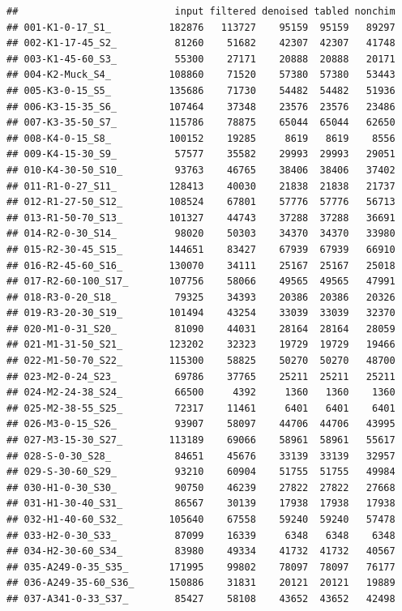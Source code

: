 \documentclass[]{article}
\begin{document}
\begin{verbatim}
##                           input filtered denoised tabled nonchim
## 001-K1-0-17_S1_          182876   113727    95159  95159   89297
## 002-K1-17-45_S2_          81260    51682    42307  42307   41748
## 003-K1-45-60_S3_          55300    27171    20888  20888   20171
## 004-K2-Muck_S4_          108860    71520    57380  57380   53443
## 005-K3-0-15_S5_          135686    71730    54482  54482   51936
## 006-K3-15-35_S6_         107464    37348    23576  23576   23486
## 007-K3-35-50_S7_         115786    78875    65044  65044   62650
## 008-K4-0-15_S8_          100152    19285     8619   8619    8556
## 009-K4-15-30_S9_          57577    35582    29993  29993   29051
## 010-K4-30-50_S10_         93763    46765    38406  38406   37402
## 011-R1-0-27_S11_         128413    40030    21838  21838   21737
## 012-R1-27-50_S12_        108524    67801    57776  57776   56713
## 013-R1-50-70_S13_        101327    44743    37288  37288   36691
## 014-R2-0-30_S14_          98020    50303    34370  34370   33980
## 015-R2-30-45_S15_        144651    83427    67939  67939   66910
## 016-R2-45-60_S16_        130070    34111    25167  25167   25018
## 017-R2-60-100_S17_       107756    58066    49565  49565   47991
## 018-R3-0-20_S18_          79325    34393    20386  20386   20326
## 019-R3-20-30_S19_        101494    43254    33039  33039   32370
## 020-M1-0-31_S20_          81090    44031    28164  28164   28059
## 021-M1-31-50_S21_        123202    32323    19729  19729   19466
## 022-M1-50-70_S22_        115300    58825    50270  50270   48700
## 023-M2-0-24_S23_          69786    37765    25211  25211   25211
## 024-M2-24-38_S24_         66500     4392     1360   1360    1360
## 025-M2-38-55_S25_         72317    11461     6401   6401    6401
## 026-M3-0-15_S26_          93907    58097    44706  44706   43995
## 027-M3-15-30_S27_        113189    69066    58961  58961   55617
## 028-S-0-30_S28_           84651    45676    33139  33139   32957
## 029-S-30-60_S29_          93210    60904    51755  51755   49984
## 030-H1-0-30_S30_          90750    46239    27822  27822   27668
## 031-H1-30-40_S31_         86567    30139    17938  17938   17938
## 032-H1-40-60_S32_        105640    67558    59240  59240   57478
## 033-H2-0-30_S33_          87099    16339     6348   6348    6348
## 034-H2-30-60_S34_         83980    49334    41732  41732   40567
## 035-A249-0-35_S35_       171995    99802    78097  78097   76177
## 036-A249-35-60_S36_      150886    31831    20121  20121   19889
## 037-A341-0-33_S37_        85427    58108    43652  43652   42498

\end{verbatim}
\end{document}
